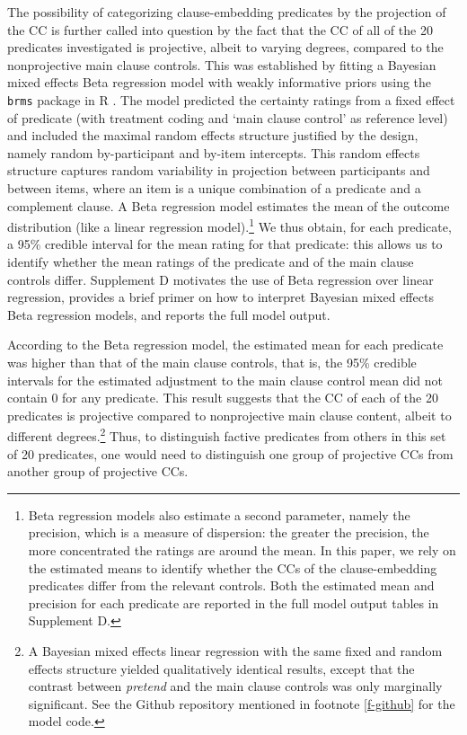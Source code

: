 \documentclass{language}
\newcommand{\6}{\mbox{$[\hspace*{-.6mm}[$}}
\newcommand{\9}{\mbox{$]\hspace*{-.6mm}]$}}
\begin{document}
The possibility of categorizing clause-embedding predicates by the projection of the CC is further called into question by the fact that the CC of all of the 20 predicates investigated is projective, albeit to varying degrees, compared to the nonprojective main clause controls. This was established by fitting a Bayesian mixed effects Beta regression model  with weakly informative priors using the \verb|brms| \citep{buerkner2017}  package in R \citep{R}. The model predicted the certainty ratings from a fixed effect of predicate (with treatment coding and `main clause control' as  reference level) and included the maximal random effects structure justified by the design, namely random by-participant and by-item intercepts. This random effects structure captures random variability in projection between participants and between items, where an item is a unique combination of a predicate and a complement clause. A Beta regression model estimates the mean of the outcome distribution (like a linear regression model).\footnote{Beta regression models also estimate a second parameter, namely the precision, which is a measure of dispersion: the greater the precision, the more concentrated the ratings are around the mean. In this paper, we rely on the estimated means to identify whether the CCs of the clause-embedding predicates differ from the relevant controls. Both the estimated mean and precision for each predicate are reported in the full model output tables in Supplement D.} We thus obtain, for each predicate, a 95\% credible interval for the mean rating for that predicate: this allows us to identify whether the mean ratings of the predicate and of the main clause controls differ. Supplement D motivates the use of Beta regression over linear regression, provides a brief primer on how to interpret Bayesian mixed effects Beta regression models, and reports the full model output.

According to the Beta regression model, the estimated mean for each predicate was higher than that of the main clause controls, that is, the 95\% credible intervals for the estimated adjustment to the main clause control mean did not contain 0 for any predicate. This result suggests that the CC of each of the 20 predicates is projective compared to nonprojective main clause content, albeit to different degrees.\footnote{A Bayesian mixed effects linear regression with the same fixed and random effects structure yielded qualitatively identical results, except that the contrast between \emph{pretend} and the main clause controls was only marginally significant. See the Github repository mentioned in footnote \ref{f-github} for the model code.} Thus, to distinguish factive predicates from others in this set of 20 predicates, one would need to distinguish one group of  projective CCs from another group of projective CCs.
\end{document}
